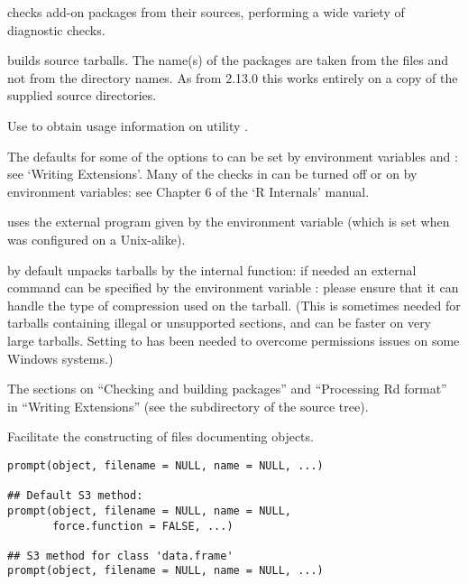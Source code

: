 %
\begin{Details}\relax
{}
checks \R{} add-on packages from their sources, performing a wide
variety of diagnostic checks.

 builds \R{} source tarballs.  The name(s) of the
packages are taken from the  files and not from the
directory names.  As from \R{} 2.13.0 this works entirely on a copy of
the supplied source directories.

Use  to obtain usage information on
utility .

The defaults for some of the options to  can be
set by environment variables  and
: see `Writing \R{} Extensions'.
Many of the checks in  can be turned off or on by
environment variables: see Chapter 6 of the `R Internals' manual.

 uses the external  program given by
the  environment variable (which is set when \R{} was
configured on a Unix-alike).

 by default unpacks tarballs by the internal
 function: if needed an external 
command can be specified by the environment variable
: please ensure that it can handle the type of
compression used on the tarball.  (This is sometimes needed for
tarballs containing illegal or unsupported sections, and can be faster
on very large tarballs.  Setting  to 
has been needed to overcome permissions issues on some Windows
systems.)
\end{Details}
%
\begin{SeeAlso}\relax
The sections on ``Checking and building packages'' and
``Processing Rd format'' in ``Writing \R{} Extensions''
(see the  subdirectory of the \R{} source tree).
\end{SeeAlso}
%
\begin{Description}\relax
Facilitate the constructing of files documenting \R{} objects.
\end{Description}
%
\begin{Usage}
\begin{verbatim}
prompt(object, filename = NULL, name = NULL, ...)

## Default S3 method:
prompt(object, filename = NULL, name = NULL,
       force.function = FALSE, ...)

## S3 method for class 'data.frame'
prompt(object, filename = NULL, name = NULL, ...)
\end{verbatim}
\end{Usage}
